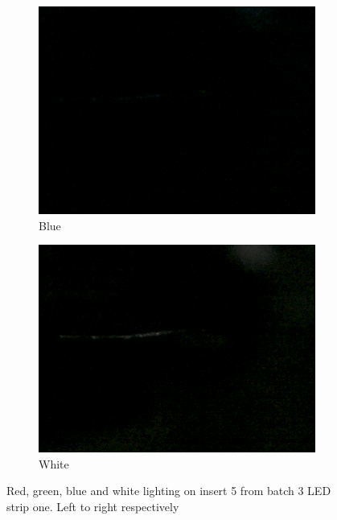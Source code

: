 \begin{figure}
				\hspace*{\fill}
				\begin{subfigure}{0.24\textwidth}
					\includegraphics[width=\linewidth, keepaspectratio=true]{./fig/Vision/Dataset/automated_datasets/2_created_datasets/1_Birthday_dataset/b_003_p_005_b_l_006_blue_A.png}
					\caption{Blue}
				\end{subfigure}
				\hspace*{\fill}
				\begin{subfigure}{0.24\textwidth}
					\includegraphics[width=\linewidth, keepaspectratio=true]{./fig/Vision/Dataset/automated_datasets/2_created_datasets/1_Birthday_dataset/b_003_p_005_b_l_006_white_A.png}
					\caption{White}
				\end{subfigure}
			\caption{Red, green, blue and white lighting on insert 5 from batch 3 LED strip one. Left to right respectively}
			\label{fig:impl:dataset:birthday:strip1}
		\end{figure}

